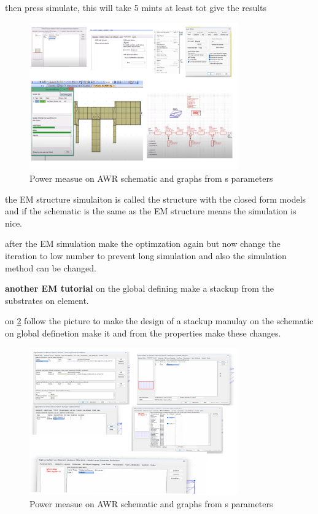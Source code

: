 \documentclass{article}
\begin{document}
\begin{itemize}
then press simulate, this will  take 5 mints at least tot give the results 

\begin{figure}[H]
    \centering
    \includegraphics[width=0.8\textwidth]{figures/Em1.pdf}
    \caption{Power measue on AWR schematic and graphs from s parameters}
    \label{Em1}
\end{figure}

the EM structure simulaiton is called the structure with the closed form models and if the schematic is the same as the EM structure means the simulation is nice.

after the EM simulation make the optimzation again but now change the iteration to low number to prevent long simulation and also the simulation method can be changed.

\textbf{another EM tutorial}
on the global defining make a stackup from the substrates on element.

on \cref{Em2} follow the picture to make the design of a stackup manulay on the schematic on global definetion make it and from the properties make these changes.
\begin{figure}[H]
    \centering
    \includegraphics[width=0.8\textwidth]{figures/Em2.pdf}
    \caption{Power measue on AWR schematic and graphs from s parameters}
    \label{Em2}
\end{figure}



\end{itemize}
\end{document}
